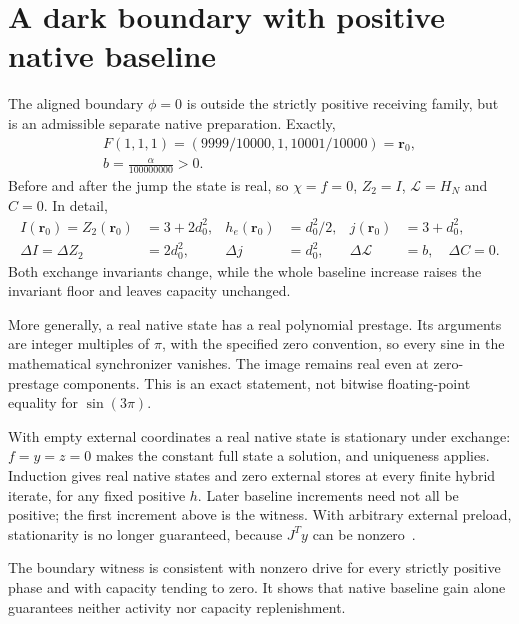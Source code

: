 \section{A dark boundary with positive native baseline}\label{sec:dark}
The aligned boundary $\phi=0$ is outside the strictly positive receiving family, but is an admissible separate native preparation. Exactly,
\begin{equation}\label{eq:a58}%
\begin{gathered}
F(1,1,1)=(9999/10000,1,10001/10000)=\mathbf r_0,\\ b=\frac\alpha{100000000}>0.
\end{gathered}
\end{equation}
Before and after the jump the state is real, so $\chi=f=0$, $Z_2=I$, $\mathcal L=H_N$ and $C=0$. In detail,
\begin{equation}\label{eq:a59}%
\begin{aligned}
I(\mathbf r_0)=Z_2(\mathbf r_0)&=3+2d_0^2,&
h_e(\mathbf r_0)&=d_0^2/2,& j(\mathbf r_0)&=3+d_0^2,\\
\Delta I=\Delta Z_2&=2d_0^2,&
\Delta j&=d_0^2,& \Delta \mathcal L&=b,\quad\Delta C=0.
\end{aligned}
\end{equation}
Both exchange invariants change, while the whole baseline increase raises the invariant floor and leaves capacity unchanged.

More generally, a real native state has a real polynomial prestage. Its arguments are integer multiples of $\pi$, with the specified zero convention, so every sine in the mathematical synchronizer vanishes. The image remains real even at zero-prestage components. This is an exact statement, not bitwise floating-point equality for $\sin(3\pi)$.

With empty external coordinates a real native state is stationary under exchange: $f=y=z=0$ makes the constant full state a solution, and uniqueness applies. Induction gives real native states and zero external stores at every finite hybrid iterate, for any fixed positive $h$. Later baseline increments need not all be positive; the first increment above is the witness. With arbitrary external preload, stationarity is no longer guaranteed, because $J^Ty$ can be nonzero~\cite[Section 3, zero ceiling and drive]{pc}.

The boundary witness is consistent with nonzero drive for every strictly positive phase and with capacity tending to zero. It shows that native baseline gain alone guarantees neither activity nor capacity replenishment.
